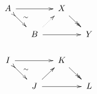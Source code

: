 \documentclass{standalone}
\begin{document}
\pagecolor{bg-color}
\color{fg-color}
\(
\xymatrix@M=6pt@C=12pt@R=12pt{
 A \ar[rr] \ar@{>->}[dr]^-{\sim} &  & X \ar@{->>}[dr] &  \\
  & B \ar[rr] \ar@{.>}[ur] &  & Y \\
 I \ar[rr] \ar@{>->}[dr]^-{\sim} &  & K \ar@{->>}[dr] &  \\
  & J \ar[rr] \ar[ur] &  & L \\
}
\)
\end{document}
